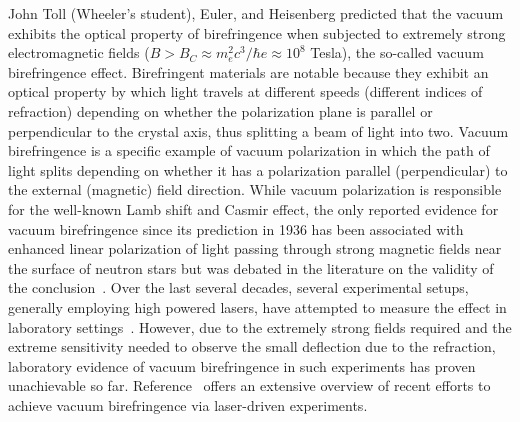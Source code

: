 \documentclass[twocolumn,epjc3]{svjour3}\sloppy
\begin{document}
John Toll (Wheeler's student), Euler, and Heisenberg predicted that the vacuum exhibits the optical property of birefringence when subjected to extremely strong electromagnetic fields ($B > B_{C} \approx m_e^2c^3/\hbar e \approx 10^8$ Tesla), the so-called vacuum birefringence effect\cite{DISPERSIONRELATIONLIGHT,heisenbergFolgerungenAusDiracschen1936}. 
Birefringent materials are notable because they exhibit an optical property by which light travels at different speeds (different indices of refraction) depending on whether the polarization plane is parallel or perpendicular to the crystal axis, thus splitting a beam of light into two. 
Vacuum birefringence is a specific example of vacuum polarization in which the path of light splits depending on whether it has a polarization parallel (perpendicular) to the external (magnetic) field direction. 
While vacuum polarization\cite{heisenbergFolgerungenAusDiracschen1936} is responsible for the well-known Lamb shift and Casmir effect\cite{lamb_fine_1947,casimir_influence_1948}, the only reported evidence for vacuum birefringence since its prediction in 1936 has been associated with enhanced linear polarization of light passing through strong magnetic fields near the surface of neutron stars\cite{Mignani:2016fwz} but was debated in the literature on the validity of the conclusion~\cite{Capparelli:2017mlv}. Over the last several decades, several experimental setups, generally employing high powered lasers, have attempted to measure the effect in laboratory settings~\cite{vallePVLASExperimentMeasuring2016}. However, due to the extremely strong fields required and the extreme sensitivity needed to observe the small deflection due to the refraction, laboratory evidence of vacuum birefringence in such experiments has proven unachievable so far. Reference~\cite{PVLASExperiment25} offers an extensive overview of recent efforts to achieve vacuum birefringence via laser-driven experiments.
\end{document}
